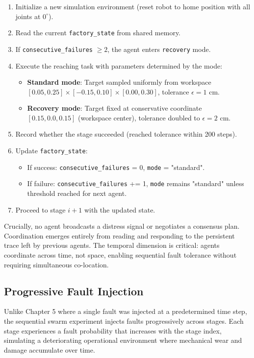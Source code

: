 \documentclass[12pt,a4paper,oneside]{report}
\begin{document}
\begin{enumerate}
    \item Initialize a new simulation environment (reset robot to home position with all joints at $0^\circ$).
    \item Read the current \texttt{factory\_state} from shared memory.
    \item If \texttt{consecutive\_failures} $\geq 2$, the agent enters \texttt{recovery} mode.
    \item Execute the reaching task with parameters determined by the mode:
        \begin{itemize}
            \item \textbf{Standard mode}: Target sampled uniformly from workspace $[0.05, 0.25] \times [-0.15, 0.10] \times [0.00, 0.30]$, tolerance $\epsilon = 1$ cm.
            \item \textbf{Recovery mode}: Target fixed at conservative coordinate $[0.15, 0.0, 0.15]$ (workspace center), tolerance doubled to $\epsilon = 2$ cm.
        \end{itemize}
    \item Record whether the stage succeeded (reached tolerance within 200 steps).
    \item Update \texttt{factory\_state}:
        \begin{itemize}
            \item If success: \texttt{consecutive\_failures} = 0, \texttt{mode} = "standard".
            \item If failure: \texttt{consecutive\_failures} += 1, \texttt{mode} remains "standard" unless threshold reached for next agent.
        \end{itemize}
    \item Proceed to stage $i+1$ with the updated state.
\end{enumerate}

Crucially, no agent broadcasts a distress signal or negotiates a consensus plan. Coordination emerges entirely from reading and responding to the persistent trace left by previous agents. The temporal dimension is critical: agents coordinate across time, not space, enabling sequential fault tolerance without requiring simultaneous co-location.

\subsection{Progressive Fault Injection}

Unlike Chapter 5 where a single fault was injected at a predetermined time step, the sequential swarm experiment injects faults progressively across stages. Each stage experiences a fault probability that increases with the stage index, simulating a deteriorating operational environment where mechanical wear and damage accumulate over time.
\end{document}
